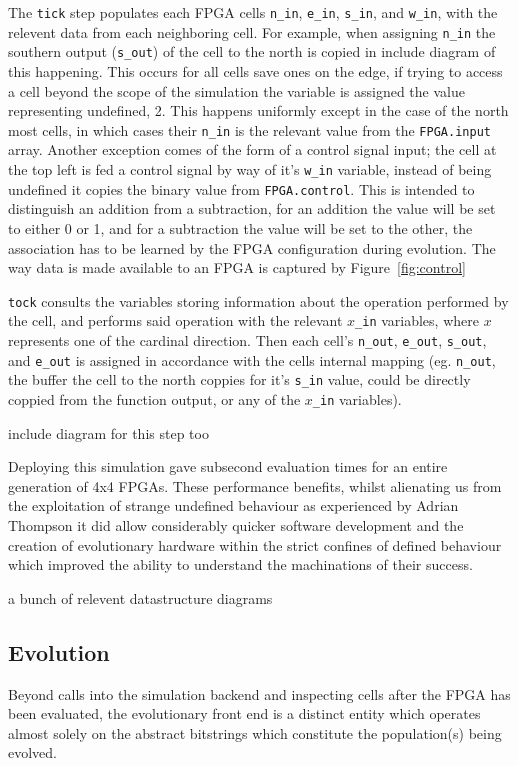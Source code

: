 The \texttt{tick} step populates each FPGA cells \texttt{n\_in}, \texttt{e\_in},
\texttt{s\_in}, and \texttt{w\_in}, with the relevent data from each neighboring cell.
For example, when assigning \texttt{n\_in} the southern output (\texttt{s\_out})
of the cell to the north is copied in \todo include diagram of this happening.
This occurs for all cells save ones on the edge, if trying
to access a cell beyond the scope of the simulation the variable is assigned the value
representing undefined, 2. This happens uniformly except in the case of the north most cells,
in which cases their \texttt{n\_in} is the relevant value from the \texttt{FPGA.input}
array. Another exception comes of the form of a control signal input; the cell at the top
left is fed a control signal by way of it's \texttt{w\_in} variable, instead of being undefined
it copies the binary value from \texttt{FPGA.control}. This is intended to distinguish
an addition from a subtraction, for an addition the value will be set to either 0 or 1,
and for a subtraction the value will be set to the other, the association has to be
learned by the FPGA configuration during evolution. The way data is made available to an FPGA
is captured by Figure~\ref{fig:control}

\texttt{tock} consults the variables storing information about the operation
performed by the cell, and performs said operation with the relevant $x$\texttt{\_in} variables,
where $x$ represents one of the cardinal direction.
Then each cell's \texttt{n\_out}, \texttt{e\_out}, \texttt{s\_out}, and \texttt{e\_out}
is assigned in accordance with the cells internal mapping (eg. \texttt{n\_out}, the
buffer the cell to the north coppies for it's \texttt{s\_in} value, could be directly
coppied from the function output, or any of the $x$\texttt{\_in} variables).

\todo include diagram for this step too

Deploying this simulation gave subsecond evaluation times for an entire generation of
4x4 FPGAs. These performance benefits, whilst alienating us from the exploitation
of strange undefined behaviour as experienced by Adrian Thompson\cite{10.1007/3-540-63173-9_61}
it did allow considerably quicker software development and the creation of
evolutionary hardware within the strict confines of defined behaviour which
improved the ability to understand the machinations of their success.

\todo a bunch of relevent datastructure diagrams

\subsection{Evolution}
Beyond calls into the simulation backend and inspecting cells after the FPGA
has been evaluated, the evolutionary front end is a distinct entity which operates
almost solely on the abstract bitstrings which constitute the population(s)
being evolved.

